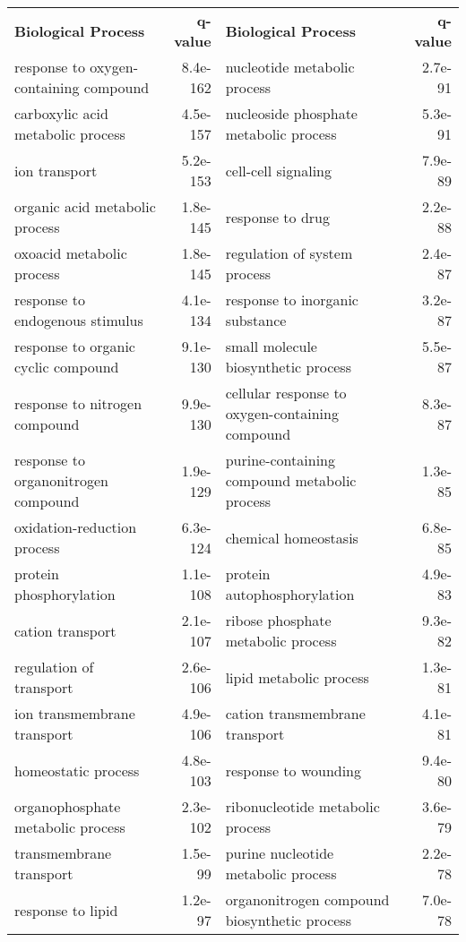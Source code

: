 \documentclass[fleqn,10pt]{SelfArx} %
\begin{document}
\begin{table}[ht]
	\centering
	\scriptsize
	\begin{tabularx}{\textwidth}{lRlR}
		\textbf{\color{white} Biological Process} & \textbf{\color{white} q-value} & \textbf{\color{white} Biological Process} & \textbf{\color{white} q-value}\\
		response to oxygen-containing compound & 8.4e-162 & nucleotide metabolic process & 2.7e-91 \\ 
		carboxylic acid metabolic process & 4.5e-157 & nucleoside phosphate metabolic process & 5.3e-91 \\ 
		ion transport & 5.2e-153 & cell-cell signaling & 7.9e-89 \\ 
		organic acid metabolic process & 1.8e-145 & response to drug & 2.2e-88 \\ 
		oxoacid metabolic process & 1.8e-145 & regulation of system process & 2.4e-87 \\ 
		response to endogenous stimulus & 4.1e-134 & response to inorganic substance & 3.2e-87 \\ 
		response to organic cyclic compound & 9.1e-130 & small molecule biosynthetic process & 5.5e-87 \\ 
		response to nitrogen compound & 9.9e-130 & cellular response to oxygen-containing compound & 8.3e-87 \\ 
		response to organonitrogen compound & 1.9e-129 & purine-containing compound metabolic process & 1.3e-85 \\ 
		oxidation-reduction process & 6.3e-124 & chemical homeostasis & 6.8e-85 \\ 
		protein phosphorylation & 1.1e-108 & protein autophosphorylation & 4.9e-83 \\ 
		cation transport & 2.1e-107 & ribose phosphate metabolic process & 9.3e-82 \\ 
		regulation of transport & 2.6e-106 & lipid metabolic process & 1.3e-81 \\ 
		ion transmembrane transport & 4.9e-106 & cation transmembrane transport & 4.1e-81 \\ 
		homeostatic process & 4.8e-103 & response to wounding & 9.4e-80 \\ 
		organophosphate metabolic process & 2.3e-102 & ribonucleotide metabolic process & 3.6e-79 \\ 
		transmembrane transport & 1.5e-99 & purine nucleotide metabolic process & 2.2e-78 \\ 
		response to lipid & 1.2e-97 & organonitrogen compound biosynthetic process & 7.0e-78 \\ 

\end{tabularx}
\end{table}
\end{document}
